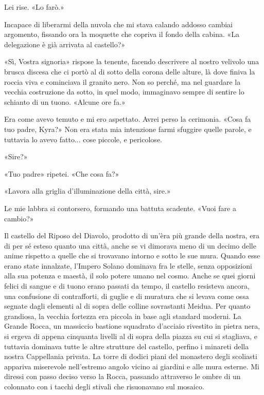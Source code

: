 Lei rise. «Lo farò.»

Incapace di liberarmi della nuvola che mi stava calando addosso cambiai
argomento, fissando ora la moquette che copriva il fondo della cabina.
«La delegazione è già arrivata al castello?»

«Sì, Vostra signoria» rispose la tenente, facendo descrivere al nostro
velivolo una brusca discesa che ci portò al di sotto della corona delle
alture, là dove finiva la roccia viva e cominciava il granito nero. Non
so perché, ma nel guardare la vecchia costruzione da sotto, in quel
modo, immaginavo sempre di sentire lo schianto di un tuono. «Alcune ore
fa.»

Era come avevo temuto e mi ero aspettato. Avrei perso la cerimonia.
«Cosa fa tuo padre, Kyra?» Non era stata mia intenzione farmi sfuggire
quelle parole, e tuttavia lo avevo fatto... cose piccole, e pericolose.

«Sire?»

«Tuo padre» ripetei. «Che cosa fa?»

«Lavora alla griglia d'illuminazione della città, sire.»

Le mie labbra si contorsero, formando una battuta scadente. «Vuoi fare a
cambio?»

\begin{figure}
	\centering
	\def\svgwidth{\columnwidth}
	\scalebox{0.2}{}
\end{figure}

Il castello del Riposo del Diavolo, prodotto di un'èra più grande della
nostra, era di per sé esteso quanto una città, anche se vi dimorava meno
di un decimo delle anime rispetto a quelle che si trovavano intorno e
sotto le sue mura. Quando esse erano state innalzate, l'Impero Solano
dominava fra le stelle, senza opposizioni alla sua potenza e maestà, il
solo potere umano nel cosmo. Anche se quei giorni felici di sangue e di
tuono erano passati da tempo, il castello resisteva ancora, una
confusione di contrafforti, di guglie e di muratura che si levava come
ossa segnate dagli elementi al di sopra delle colline sovrastanti
Meidua. Per quanto grandiosa, la vecchia fortezza era piccola in base
agli standard moderni. La Grande Rocca, un massiccio bastione squadrato
d'acciaio rivestito in pietra nera, si ergeva di appena cinquanta
livelli al di sopra della piazza su cui si stagliava, e tuttavia
dominava tutte le altre strutture del castello, perfino i minareti della
nostra Cappellania privata. La torre di dodici piani del monastero degli
scoliasti appariva miserevole nell'estremo angolo vicino ai giardini e
alle mura esterne. Mi diressi con passo deciso verso la Rocca, passando
attraverso le ombre di un colonnato con i tacchi degli stivali che
risuonavano sul mosaico.

